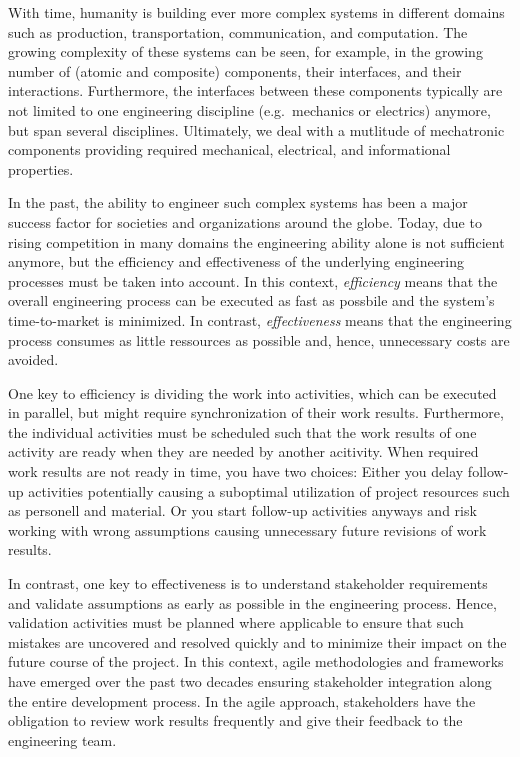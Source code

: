 \documentclass{PDS}
\begin{document}
With time, humanity is building ever more complex systems in different domains such as production, transportation, communication, and computation.
The growing complexity of these systems can be seen, for example, in the growing number of (atomic and composite) components, their interfaces, and their interactions.
Furthermore, the interfaces between these components typically are not limited to one engineering discipline (e.g.\ mechanics or electrics) anymore, but span several disciplines.
Ultimately, we deal with a mutlitude of mechatronic components providing required mechanical, electrical, and informational properties.

In the past, the ability to engineer such complex systems has been a major success factor for societies and organizations around the globe.
Today, due to rising competition in many domains the engineering ability alone is not sufficient anymore, but the efficiency and effectiveness of the underlying engineering processes must be taken into account.
In this context, \textit{efficiency} means that the overall engineering process can be executed as fast as possbile and the system's time-to-market is minimized.
In contrast, \textit{effectiveness} means that the engineering process consumes as little ressources as possible and, hence, unnecessary costs are avoided.

One key to efficiency is dividing the work into activities, which can be executed in parallel, but might require synchronization of their work results.
Furthermore, the individual activities must be scheduled such that the work results of one activity are ready when they are needed by another acitivity.
When required work results are not ready in time, you have two choices:
Either you delay follow-up activities potentially causing a suboptimal utilization of project resources such as personell and material.
Or you start follow-up activities anyways and risk working with wrong assumptions causing unnecessary future revisions of work results.

In contrast, one key to effectiveness is to understand stakeholder requirements and validate assumptions as early as possible in the engineering process.
Hence, validation activities must be planned where applicable to ensure that such mistakes are uncovered and resolved quickly and to minimize their impact on the future course of the project.
In this context, agile methodologies and frameworks have emerged over the past two decades ensuring stakeholder integration along the entire development process.
In the agile approach, stakeholders have the obligation to review work results frequently and give their feedback to the engineering team.
\end{document}

